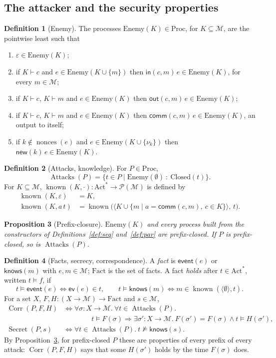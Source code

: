 \documentclass[11pt]{article}
\theoremstyle{definition}
\newtheorem{definition}{Definition}[section]
\theoremstyle{plain}
\newtheorem{proposition}[definition]{Proposition}
\theoremstyle{remark}
\newcommand{\Msg}{\mathcal{M}}
\newcommand{\Act}{\mathrm{Act}}
\newcommand{\Proc}{\mathrm{Proc}}
\newcommand{\aout}{\mathsf{out}}
\newcommand{\ain}{\mathsf{in}}
\newcommand{\anew}{\mathsf{new}}
\newcommand{\aev}{\mathsf{ev}}
\newcommand{\acomm}{\mathsf{comm}}
\newcommand{\known}{\operatorname{known}}
\newcommand{\knows}{\pv{knows}}
\newcommand{\Fact}{\mathrm{Fact}}
\newcommand{\Closed}{\mathrm{Closed}}
\newcommand{\nonces}{\operatorname{nonces}}
\newcommand{\Enemy}{\mathrm{Enemy}}
\newcommand{\Attacks}{\operatorname{Attacks}}
\newcommand{\Secret}{\operatorname{Secret}}
\newcommand{\Corr}{\operatorname{Corr}}
\newcommand{\pv}[1]{\mathsf{#1}}
\newcommand{\event}{\pv{event}}
\begin{document}
\subsection{The attacker and the security properties}

\begin{definition}[Enemy]
The processes $\Enemy(K)\in\Proc$, for $K\subseteq\Msg$, are the pointwise least such that
\begin{enumerate}
\item $\varepsilon\in\Enemy(K)$;
\item if $K\vdash c$ and $e\in\Enemy(K\cup\{m\})$ then $\ain(c,m)\,e\in\Enemy(K)$, for every $m\in\Msg$;
\item if $K\vdash c$, $K\vdash m$ and $e\in\Enemy(K)$ then $\aout(c,m)\,e\in\Enemy(K)$;
\item if $K\vdash c$, $K\vdash m$ and $e\in\Enemy(K)$ then $\acomm(c,m)\,e\in\Enemy(K)$, an output to itself;
\item if $k\notin\nonces(e)$ and $e\in\Enemy(K\cup\{\nu_k\})$ then $\anew(k)\,e\in\Enemy(K)$.
\end{enumerate}
\end{definition}

\begin{definition}[Attacks, knowledge]
For $P\in\Proc$,
\[
\Attacks(P)=\{t\in P\mid\Enemy(\emptyset)\ :\ \Closed(t)\}.
\]
For $K\subseteq\Msg$, $\known(K,\cdot):\Act^*\to\mathcal{P}(\Msg)$ is defined by
\begin{align*}
\known(K,\varepsilon)&=K,\\
\known(K,a\,t)&=\known\big(\langle K\cup\{m\mid a=\acomm(c,m),\ c\in K\}\rangle,\,t\big).
\end{align*}
\end{definition}

\begin{proposition}[Prefix-closure]\label{prop:prefix}
$\Enemy(K)$ and every process built from the constructors of Definitions~\ref{def:seq} and~\ref{def:par} are prefix-closed. If $P$ is prefix-closed, so is $\Attacks(P)$.
\end{proposition}

\begin{definition}[Facts, secrecy, correspondence]
A \emph{fact} is $\event(e)$ or $\knows(m)$ with $e,m\in\Msg$; $\Fact$ is the set of facts. A fact \emph{holds} after $t\in\Act^*$, written $t\models f$, if
\[
t\models\event(e)\iff\aev(e)\in t,\qquad
t\models\knows(m)\iff m\in\known(\langle\emptyset\rangle,t).
\]
For a set $X$, $F,H:(X\to\Msg)\to\Fact$ and $s\in\Msg$,
\begin{align*}
\Corr(P,F,H)&\iff\forall\sigma:X\to\Msg.\ \forall t\in\Attacks(P).\\
&\qquad\qquad t\models F(\sigma)\Rightarrow\exists\sigma':X\to\Msg.\ F(\sigma')=F(\sigma)\wedge t\models H(\sigma'),\\
\Secret(P,s)&\iff\forall t\in\Attacks(P).\ t\not\models\knows(s).
\end{align*}
By Proposition~\ref{prop:prefix}, for prefix-closed $P$ these are properties of every prefix of every attack: $\Corr(P,F,H)$ says that some $H(\sigma')$ holds by the time $F(\sigma)$ does.
\end{definition}
\end{document}
